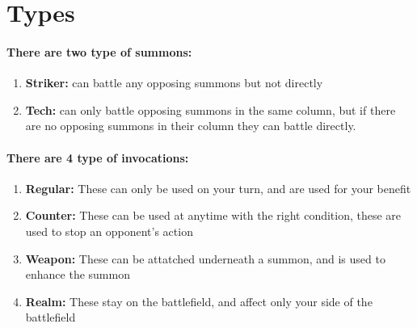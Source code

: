 \documentclass[12pt, letterpaper]{article}
\begin{document}
   \section{Types}
   \paragraph{\textbf{There are two type of summons: }}
   \begin{enumerate}
       \item \textbf{Striker:} can battle any opposing summons but not directly
       \item \textbf{Tech:} can only battle opposing summons in the same column, but if there are no opposing summons in their column they can battle directly.
   \end{enumerate}
   \paragraph{\textbf{There are 4 type of invocations: }}
   \begin{enumerate}
       \item \textbf{Regular:} These can only be used on your turn, and are used for your benefit 
       \item \textbf{Counter:} These can be used at anytime with the right condition, these are used to stop an opponent's action
       \item \textbf{Weapon:} These can be attatched underneath a summon, and is used to enhance the summon
       \item \textbf{Realm:} These stay on the battlefield, and affect only your side of the battlefield 
   \end{enumerate}
\end{document}

